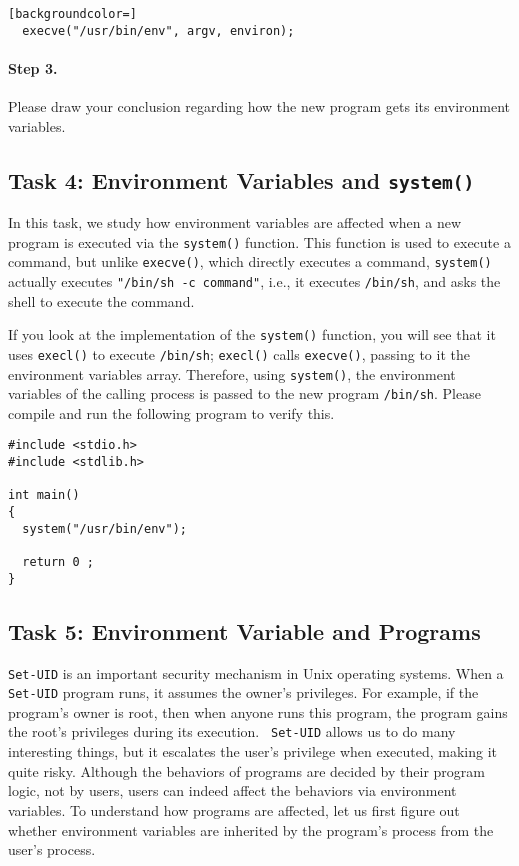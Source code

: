 \begin{lstlisting}[backgroundcolor=]
  execve("/usr/bin/env", argv, environ);
\end{lstlisting}


\paragraph{Step 3.} Please draw your conclusion regarding how the new
program gets its environment variables. 



\subsection{Task 4: Environment Variables and {\tt system()}}

In this task, we study how environment variables are affected 
when a new program is executed via the {\tt system()} function. This 
function is used to execute a command, but unlike
{\tt execve()}, which directly executes a command, {\tt system()}
actually executes {\tt "/bin/sh -c command"}, i.e., it
executes {\tt /bin/sh}, and asks the shell to execute the command.

If you look at the implementation of the {\tt system()} function, you will
see that it uses {\tt execl()} to execute {\tt /bin/sh}; {\tt execl()}
calls {\tt execve()}, passing to it the environment variables array. 
Therefore, using {\tt system()},  the environment variables of the calling process 
is passed to the new program {\tt /bin/sh}. Please compile and run the following program
to verify this. 


\begin{lstlisting}
#include <stdio.h>
#include <stdlib.h>

int main()
{
  system("/usr/bin/env");

  return 0 ;
}
\end{lstlisting}



\subsection{Task 5: Environment Variable and \setuid Programs}

{\tt Set-UID} is an important security mechanism in Unix operating systems.
When a {\tt Set-UID} program runs, it assumes the owner's privileges. For
example, if the program's owner is root, then when anyone runs this
program, the program gains the root's privileges during its execution. {\tt
Set-UID} allows us to do many interesting things, but it escalates the
user's privilege when executed, making it quite risky. Although the
behaviors of \setuid programs are decided by their program logic, not by
users, users can indeed affect the behaviors via environment variables. 
To understand how \setuid programs are affected, let us first figure out
whether environment variables are inherited by the \setuid program's
process from the user's process.


